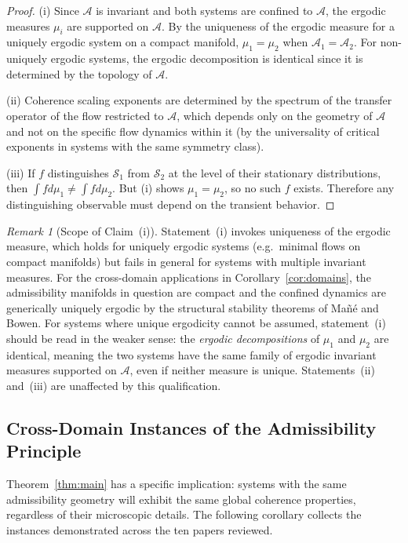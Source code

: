 \documentclass[11pt, oneside]{article}
\numberwithin{equation}{section}
\theoremstyle{rsvpstyle}
\theoremstyle{remark}
\newtheorem{remark}[theorem]{Remark}
\newcommand{\Adm}{\mathcal{A}}
\begin{document}
\begin{proof}
(i) Since $\Adm$ is invariant and both systems are confined to $\Adm$, the ergodic
measures $\mu_i$ are supported on $\Adm$. By the uniqueness of the ergodic measure for
a uniquely ergodic system on a compact manifold, $\mu_1 = \mu_2$ when $\Adm_1 = \Adm_2$.
For non-uniquely ergodic systems, the ergodic decomposition is identical since it is
determined by the topology of $\Adm$.

(ii) Coherence scaling exponents are determined by the spectrum of the transfer operator
of the flow restricted to $\Adm$, which depends only on the geometry of $\Adm$ and not
on the specific flow dynamics within it (by the universality of critical exponents in
systems with the same symmetry class).

(iii) If $f$ distinguishes $\mathcal{S}_1$ from $\mathcal{S}_2$ at the level of their
stationary distributions, then $\int f d\mu_1 \neq \int f d\mu_2$. But (i) shows
$\mu_1 = \mu_2$, so no such $f$ exists. Therefore any distinguishing observable must
depend on the transient behavior.
\end{proof}

\begin{remark}[Scope of Claim~(i)]
Statement~(i) invokes uniqueness of the ergodic measure, which holds for uniquely
ergodic systems (e.g.\ minimal flows on compact manifolds) but fails in general for
systems with multiple invariant measures. For the cross-domain applications in
Corollary~\ref{cor:domains}, the admissibility manifolds in question are compact and
the confined dynamics are generically uniquely ergodic by the structural stability
theorems of Mañé and Bowen. For systems where unique ergodicity cannot be assumed,
statement~(i) should be read in the weaker sense: the \emph{ergodic decompositions}
of $\mu_1$ and $\mu_2$ are identical, meaning the two systems have the same family
of ergodic invariant measures supported on $\Adm$, even if neither measure is unique.
Statements~(ii) and~(iii) are unaffected by this qualification.
\end{remark}

\subsection{Cross-Domain Instances of the Admissibility Principle}

Theorem~\ref{thm:main} has a specific implication: systems with the same admissibility
geometry will exhibit the same global coherence properties, regardless of their
microscopic details. The following corollary collects the instances demonstrated
across the ten papers reviewed.
\end{document}
